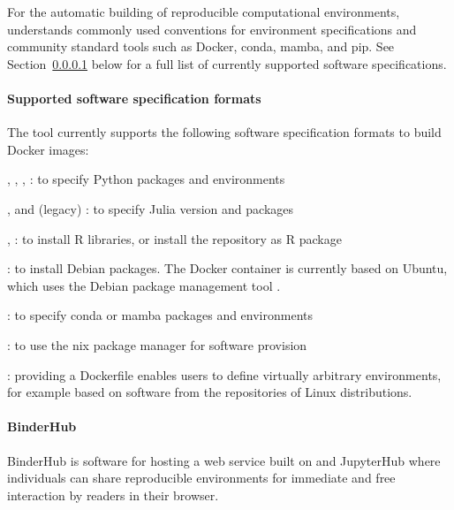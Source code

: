 For the automatic building of reproducible computational environments,
\repotodocker{} understands commonly used conventions for environment specifications and
community standard tools such as Docker, conda, mamba, and pip. See
Section~\ref{repo2docker-supported-software-specifications} below for a full list of
currently supported software specifications.

\paragraph{Supported software specification formats}
\label{repo2docker-supported-software-specifications}
The \repotodocker{} tool currently supports the following software specification
formats to build Docker images:
\begin{compactitem}
\item {}, ,
  , : to specify Python
  packages and environments
\item {},  and (legacy)
  : to
  specify Julia version and packages
\item {}, : to install R
  libraries, or install the repository as R package
\item {}: to install Debian packages. The Docker container
  is currently based on Ubuntu, which uses the Debian package management tool .
\item {}: to specify conda or mamba packages and
  environments
\item {}: to use the nix package manager for software provision
\item {}: providing a Dockerfile enables users to define
  virtually arbitrary environments, for example based on software from the
  repositories of Linux distributions.
\end{compactitem}

\paragraph{BinderHub}\label{sec:binderhub}
BinderHub is software for hosting a web service built on \repotodocker{} and
JupyterHub where individuals can share reproducible environments for
immediate and free interaction by readers in their browser.


